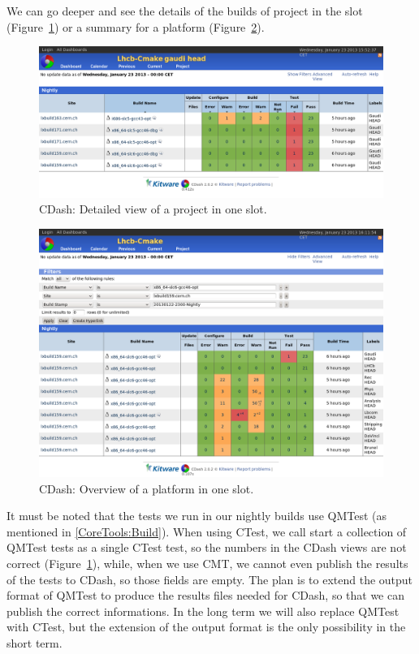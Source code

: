 \documentclass{lhcbnote}
\begin{document}
We can go deeper and see the details of the builds of project in the slot
(Figure~\ref{fig:cdash-project}) or a summary for a platform
(Figure~\ref{fig:cdash-platform}).

\begin{figure}
  \begin{center}
    \includegraphics[width=15cm]{images/cdash-3}
  \end{center}
  \caption{CDash: Detailed view of a project in one slot.}
  \label{fig:cdash-project}
\end{figure}

\begin{figure}
  \begin{center}
    \includegraphics[width=15cm]{images/cdash-4}
  \end{center}
  \caption{CDash: Overview of a platform in one slot.}
  \label{fig:cdash-platform}
\end{figure}

It must be noted that the tests we run in our nightly builds use
QMTest\cite{QMTestPaper} (as mentioned in \ref{CoreTools:Build}).  When using
CTest, we call start a collection of QMTest tests as a single CTest test, so the
numbers in the CDash views are not correct (Figure~\ref{fig:cdash-project}),
while, when we use CMT, we cannot even publish the results of the tests to
CDash, so those fields are empty.  The plan is to extend the output format of
QMTest to produce the results files needed for CDash, so that we can publish the
correct informations.  In the long term we will also replace QMTest with CTest,
but the extension of the output format is the only possibility in the short
term.
\end{document}
